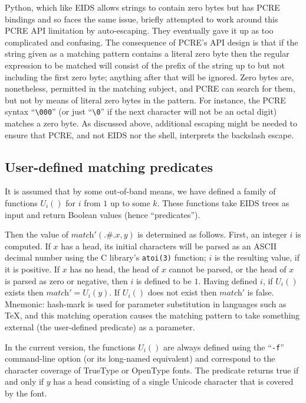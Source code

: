 \documentclass[twocolumn]{report}
\begin{document}
Python, which like EIDS allows strings to contain zero bytes but has PCRE
bindings and so faces the same issue, briefly attempted to work around this
PCRE API limitation by auto-escaping.  They eventually gave it up as too
complicated and confusing.  The consequence of PCRE's API design is that if
the string given as a matching pattern contains a literal zero byte then the
regular expression to be matched will consist of the prefix of the string up
to but not including the first zero byte; anything after that will be
ignored.  Zero bytes are, nonetheless, permitted in the matching subject,
and PCRE can search for them, but not by means of literal zero bytes in the
pattern.  For instance, the PCRE syntax ``\texttt{\textbackslash000}'' (or
just ``\texttt{\textbackslash0}'' if the next character will
not be an octal digit) matches a zero byte.  As discussed above,
additional escaping might be needed to ensure that PCRE, and not EIDS nor
the shell, interprets the backslash escape.

\subsection{User-defined matching predicates}

It is assumed that by some out-of-band means, we have defined a
family of functions $U_i()$ for $i$ from $1$ up to some $k$.  These
functions take EIDS trees as input and return Boolean values (hence
``predicates'').

Then the value of $\textit{match}'(\texttt{.\#.}x,y)$ is determined as
follows.  First, an integer $i$ is computed.  If $x$ has a head, its
initial characters will be parsed as an ASCII decimal number using the
C library's \texttt{atoi(3)} function; $i$ is the resulting value, if
it is positive.  If $x$ has no head, the head of $x$ cannot be parsed,
or the head of $x$ is parsed as zero or negative, then $i$ is
defined to be $1$.  Having defined $i$, if $U_i()$ exists then
$\textit{match}'=U_i(y)$.  If $U_i()$
does not exist then $\textit{match}'$ is false.  Mnemonic: hash-mark
is used for parameter substitution in languages such as \TeX, and this
matching operation causes the matching pattern to take something
external (the user-defined predicate) as a parameter.

In the current version, the functions $U_i()$ are always defined using
the ``\texttt{-f}'' command-line option (or its long-named equivalent)
and correspond to the character coverage of TrueType or OpenType
fonts.  The predicate returns true if and only if $y$ has a head
consisting of a single Unicode character that is covered by the font.
\end{document}
